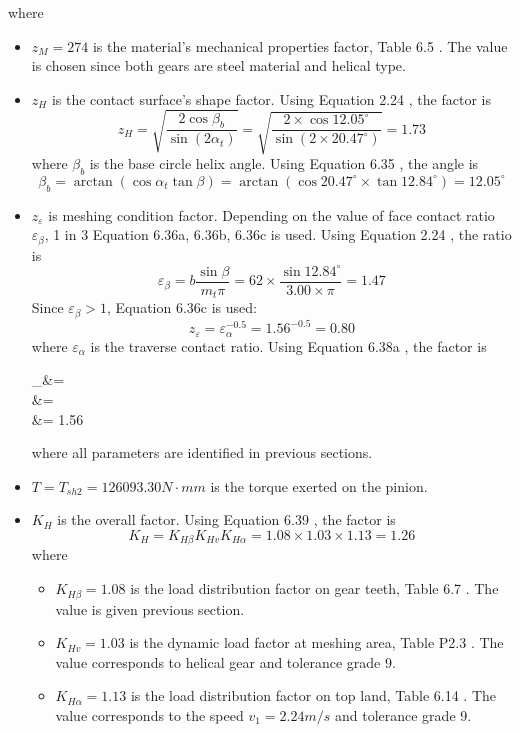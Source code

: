 where
\begin{itemize}
	\item $ z_M = 274 $ is the material's mechanical properties factor, Table 6.5 \cite{tk1}. The value is chosen since both gears are steel material and helical type.
	\item $ z_H $ is the contact surface's shape factor. Using Equation 2.24 \cite{tk1}, the factor is
	\[ z_H = \sqrt{\dfrac{2\cos\beta_b}{\sin(2\alpha_t)}} = \sqrt{\dfrac{2\times\cos 12.05^\circ}{\sin(2\times 20.47^\circ)}} = 1.73\]
	where $ \beta_b $ is the base circle helix angle. Using Equation 6.35 \cite{tk1}, the angle is
	\[ \beta_b = \arctan\left( \cos\alpha_t\tan\beta\right) = \arctan\left( \cos 20.47^\circ \times \tan 12.84^\circ\right) = 12.05^\circ\]
	\item $ z_\varepsilon $ is meshing condition factor. Depending on the value of face contact ratio $ \varepsilon_\beta $, 1 in 3 Equation 6.36a, 6.36b, 6.36c \cite{tk1} is used. Using Equation 2.24 \cite{tk1}, the ratio is
	\[\varepsilon_\beta = b\dfrac{\sin\beta}{m_t\pi} = 62\times\dfrac{\sin 12.84^\circ}{3.00\times\pi}=1.47\]
	Since $ \varepsilon_\beta >1 $, Equation 6.36c \cite{tk1} is used:
	\[z_\varepsilon = \varepsilon_\alpha^{-0.5} = 1.56^{-0.5} = 0.80\]	
	where $ \varepsilon_\alpha $ is the traverse contact ratio. Using Equation 6.38a \cite{tk1}, the factor is
	\begin{flalign*}
	\varepsilon_\alpha &= \\
	&= \\
	&= 1.56
	\end{flalign*}
	where all parameters are identified in previous sections.
	\item $ T=T_{sh2}=126093.30\unit{N\cdot mm} $ is the torque exerted on the pinion.
	\item $ K_H $ is the overall factor. Using Equation 6.39 \cite{tk1}, the factor is
	\[ K_H = K_{H\beta}K_{Hv}K_{H\alpha} = 1.08\times 1.03 \times 1.13  = 1.26\]
	where
	\begin{itemize}
		\item $ K_{H\beta} = 1.08 $ is the load distribution factor on gear teeth, Table 6.7 \cite{tk1}. The value is given previous section.
		\item $ K_{Hv} = 1.03 $ is the dynamic load factor at meshing area, Table P2.3 \cite{tk1}. The value corresponds to helical gear and tolerance grade 9.
		\item $ K_{H\alpha} = 1.13 $ is the load distribution factor on top land, Table 6.14 \cite{tk1}. The value corresponds to the speed $ v_1=2.24\unit{m/s} $ and tolerance grade 9.
	\end{itemize}
\end{itemize}


